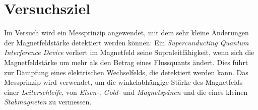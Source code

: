 \section{Versuchsziel}
Im Versuch wird ein Messprinzip angewendet,
mit dem sehr kleine Änderungen der Magnetfeldstärke detektiert werden können:
Ein \emph{Supercunducting Quantum Interference Device} verliert im Magnetfeld seine Supraleitfähigkeit,
wenn sich die Magnetfeldstärke um mehr als den Betrag eines Flussquants ändert.
Dies führt zur Dämpfung eines elektrischen Wechselfelds, die detektiert werden kann.
Das Messprinzip wird verwendet, um die winkelabhängige Stärke des Magnetfelds einer \emph{Leiterschleife},
von \emph{Eisen-, Gold-} und \emph{Magnetspänen} und die eines kleinen \emph{Stabmagneten} zu vermessen.